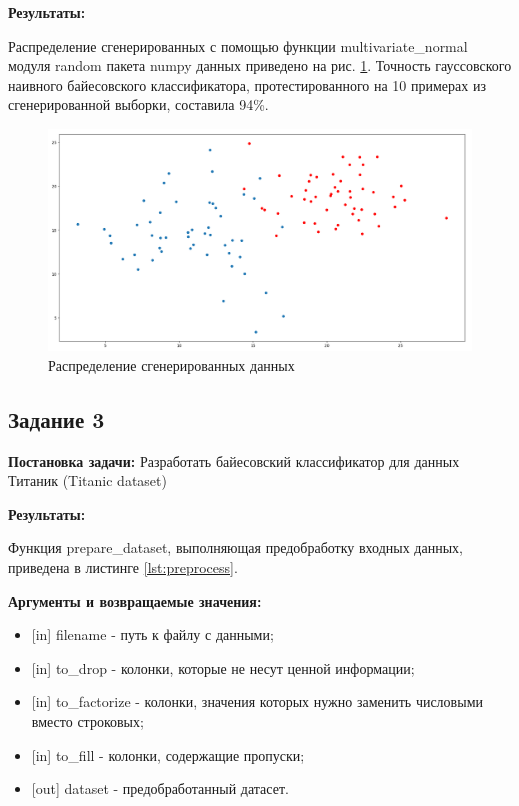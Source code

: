 \documentclass[a4paper,14pt]{article}
\begin{document}
\textbf{Результаты:}

Распределение сгенерированных с помощью функции multivariate\_normal модуля random пакета numpy данных приведено на рис. \ref{graph:task_2}. Точность гауссовского наивного байесовского классификатора, протестированного на 10 примерах из сгенерированной выборки, составила 94\%.
\begin{figure}[H]
\includegraphics[width=\textwidth, keepaspectratio]{task_2.png}
\caption{Распределение сгенерированных данных}
\label{graph:task_2}
\end{figure}

\subsection{Задание 3}

\textbf{Постановка задачи:}
Разработать байесовский классификатор для данных Титаник (Titanic dataset) 

\textbf{Результаты:}

Функция prepare\_dataset, выполняющая предобработку входных данных, приведена в листинге \ref{lst:preprocess}.

\textbf{Аргументы и возвращаемые значения:}
\begin{itemize}
	\item {[in]} filename - путь к файлу с данными;
	\item {[in]} to\_drop - колонки, которые не несут ценной информации;
	\item {[in]} to\_factorize - колонки, значения которых нужно заменить числовыми вместо строковых;
	\item {[in]} to\_fill - колонки, содержащие пропуски;
	\item {[out]} dataset - предобработанный датасет.
\end{itemize}
\end{document}
